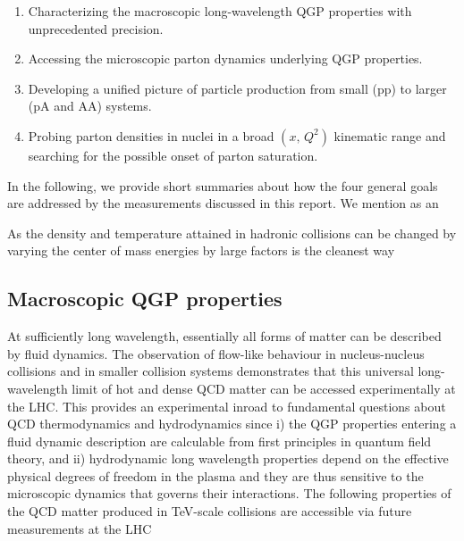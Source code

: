 \documentclass[../report.tex]{subfiles}
\begin{document}
\begin{enumerate}
\item Characterizing the macroscopic long-wavelength QGP properties with unprecedented precision. 
\item Accessing the microscopic parton dynamics underlying QGP properties.
\item Developing a unified picture of particle production from small (pp) to larger (pA and AA) systems.
\item Probing parton densities in nuclei in a broad $(x,\,Q^2)$ kinematic range and searching for the possible onset of parton saturation.
\end{enumerate}
 
In the following, we provide short summaries about how the four general goals are addressed by the measurements discussed in this report. We mention as an 

As the density and temperature attained in hadronic collisions can be changed by varying the center of mass energies by large factors is the cleanest way  

\subsection{Macroscopic QGP properties}
At sufficiently long wavelength, essentially all forms of matter can be described by fluid dynamics. The observation of flow-like behaviour in nucleus-nucleus collisions and in smaller collision systems demonstrates that this universal long-wavelength limit of hot and dense QCD matter can be accessed experimentally at the LHC. This provides an experimental inroad to fundamental questions about QCD thermodynamics and hydrodynamics since i) the QGP properties entering a fluid dynamic description are calculable from first principles in quantum field theory, and ii) hydrodynamic long wavelength properties depend on the effective physical degrees of freedom in the plasma and they are thus sensitive to the microscopic dynamics that governs their interactions. The following properties of the QCD matter produced in TeV-scale collisions
are accessible via future measurements at the LHC
\end{document}
